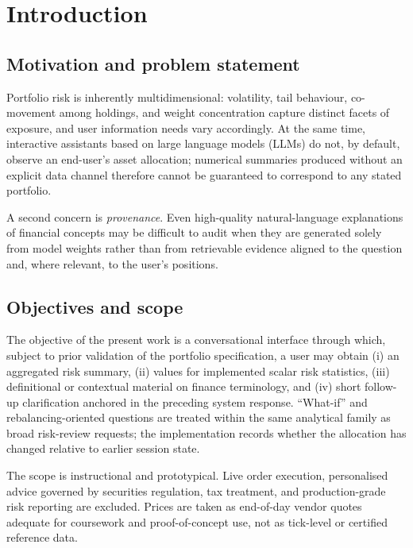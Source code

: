 \section{Introduction}
\label{sec:introduction}

\subsection{Motivation and problem statement}
Portfolio risk is inherently multidimensional: volatility, tail behaviour, co-movement among holdings, and weight concentration capture distinct facets of exposure, and user information needs vary accordingly. At the same time, interactive assistants based on large language models (LLMs) do not, by default, observe an end-user's asset allocation; numerical summaries produced without an explicit data channel therefore cannot be guaranteed to correspond to any stated portfolio.

A second concern is \emph{provenance}. Even high-quality natural-language explanations of financial concepts may be difficult to audit when they are generated solely from model weights rather than from retrievable evidence aligned to the question and, where relevant, to the user's positions.

\subsection{Objectives and scope}
The objective of the present work is a conversational interface through which, subject to prior validation of the portfolio specification, a user may obtain (i) an aggregated risk summary, (ii) values for implemented scalar risk statistics, (iii) definitional or contextual material on finance terminology, and (iv) short follow-up clarification anchored in the preceding system response. ``What-if'' and rebalancing-oriented questions are treated within the same analytical family as broad risk-review requests; the implementation records whether the allocation has changed relative to earlier session state.

The scope is instructional and prototypical. Live order execution, personalised advice governed by securities regulation, tax treatment, and production-grade risk reporting are excluded. Prices are taken as end-of-day vendor quotes adequate for coursework and proof-of-concept use, not as tick-level or certified reference data.

